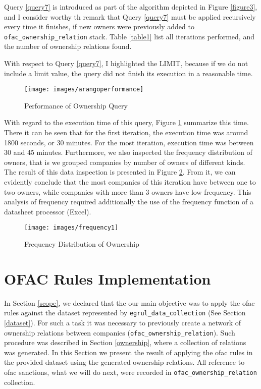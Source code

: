 \begin{spacing}{1.5}
	Query \ref{query7} is introduced as part of the algorithm depicted in Figure \ref{figure3}, and I consider worthy th remark that Query \ref{query7} must be applied recursively every time it finishes, if new owners were previously added to \texttt{ofac\_ownership\_relation} stack. Table \ref{table1} list all iterations performed, and the number of ownership relations found. 
	
	With respect to Query \ref{query7}, I highlighted the LIMIT, because if we do not include a limit value, the query did not finish its execution in a reasonable time.
	
	
	\begin{figure}
		\centering
		\texttt{[image: images/arangoperformance]}
		\caption{Performance of Ownership Query}\label{figure5}
	\end{figure}
	
	 With regard to the execution time of this query, Figure \ref{figure5} summarize this time. There it can be seen that for the first iteration, the execution time was around 1800 seconds, or 30 minutes. For the most iteration, execution time was between  30 and 45 minutes. Furthermore, we also inspected the frequency distribution of owners, that is we grouped companies by number of owners of different kinds. The result of this data inspection is presented in Figure \ref{figure6}. From it, we can evidently conclude that the most companies of this iteration have between one to two owners, while  companies with more than 3 owners have low frequency. This analysis of frequency  required additionally the use of the frequency function of a datasheet processor (Excel). 
	 
	 
	 \begin{figure}
	 	\centering
	 	\texttt{[image: images/frequency1]}
	 	\caption{Frequency Distribution of Ownership}\label{figure6}
	 \end{figure}

	
	\section{OFAC Rules Implementation}
	
	In Section \ref{scope}, we declared that the our main objective was to apply the \gls{ofac} rules against the dataset represented by \texttt{egrul\_data\_collection} (See Section \ref{dataset}). For such a task it was necessary to previously create a network of ownership relations between companies (\texttt{ofac\_ownership\_relation}). Such procedure was described in Section \ref{ownership}, where a collection of relations was generated. In this Section we present the result of applying the \gls{ofac} rules in the provided dataset using the generated ownership relations. All reference to \gls{ofac} sanctions, what we will do next, were recorded in \texttt{ofac\_ownership\_relation} collection. 
	

\end{spacing}
